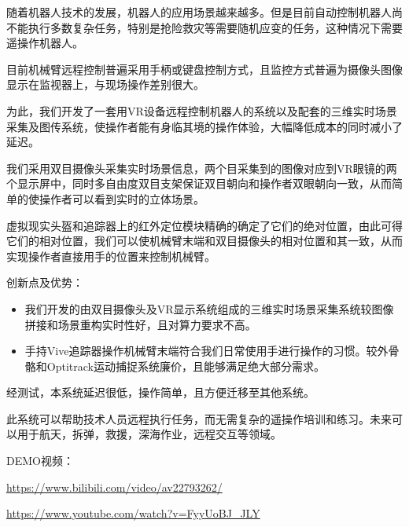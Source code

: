 % 
% 
\begin{cabstract}

随着机器人技术的发展，机器人的应用场景越来越多。但是目前自动控制机器人尚不能执行多数复杂任务，特别是抢险救灾等需要随机应变的任务，这种情况下需要遥操作机器人。

目前机械臂远程控制普遍采用手柄或键盘控制方式，且监控方式普遍为摄像头图像显示在监视器上，与现场操作差别很大。

为此，我们开发了一套用VR设备远程控制机器人的系统以及配套的三维实时场景采集及图传系统，使操作者能有身临其境的操作体验，大幅降低成本的同时减小了延迟。

我们采用双目摄像头采集实时场景信息，两个目采集到的图像对应到VR眼镜的两个显示屏中，同时多自由度双目支架保证双目朝向和操作者双眼朝向一致，从而简单的使操作者可以看到实时的立体场景。

虚拟现实头盔和追踪器上的红外定位模块精确的确定了它们的绝对位置，由此可得它们的相对位置，我们可以使机械臂末端和双目摄像头的相对位置和其一致，从而实现操作者直接用手的位置来控制机械臂。

 \bigbreak
创新点及优势：
  \begin{itemize}
    \item 我们开发的由双目摄像头及VR显示系统组成的三维实时场景采集系统较图像拼接和场景重构实时性好，且对算力要求不高。
    \item 手持Vive追踪器操作机械臂末端符合我们日常使用手进行操作的习惯。较外骨骼和Optitrack运动捕捉系统廉价，且能够满足绝大部分需求。
  \end{itemize} 
  \bigbreak

经测试，本系统延迟很低，操作简单，且方便迁移至其他系统。

此系统可以帮助技术人员远程执行任务，而无需复杂的遥操作培训和练习。未来可以用于航天，拆弹，救援，深海作业，远程交互等领域。

DEMO视频： 

\url{https://www.bilibili.com/video/av22793262/}

\url{https://www.youtube.com/watch?v=FyyUoBJ_JLY}


\end{cabstract}


